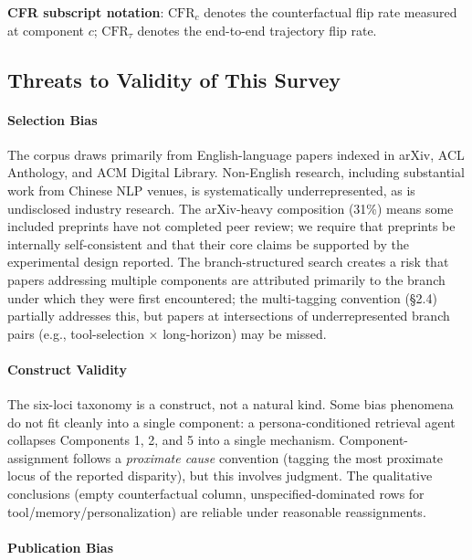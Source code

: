 \documentclass[acmsmall,nonacm]{acmart}
\begin{document}
\textbf{CFR subscript notation}: $\text{CFR}_c$ denotes the counterfactual flip rate measured at component $c$; $\text{CFR}_\tau$ denotes the end-to-end trajectory flip rate.


\subsection{Threats to Validity of This Survey}

\paragraph{Selection Bias}

The corpus draws primarily from English-language papers indexed in arXiv, ACL Anthology, and ACM Digital Library. Non-English research, including substantial work from Chinese NLP venues, is systematically underrepresented, as is undisclosed industry research. The arXiv-heavy composition (31\%) means some included preprints have not completed peer review; we require that preprints be internally self-consistent and that their core claims be supported by the experimental design reported. The branch-structured search creates a risk that papers addressing multiple components are attributed primarily to the branch under which they were first encountered; the multi-tagging convention (\S{}2.4) partially addresses this, but papers at intersections of underrepresented branch pairs (e.g., tool-selection $\times$ long-horizon) may be missed.

\paragraph{Construct Validity}

The six-loci taxonomy is a construct, not a natural kind. Some bias phenomena do not fit cleanly into a single component: a persona-conditioned retrieval agent collapses Components 1, 2, and 5 into a single mechanism. Component-assignment follows a \emph{proximate cause} convention (tagging the most proximate locus of the reported disparity), but this involves judgment. The qualitative conclusions (empty counterfactual column, unspecified-dominated rows for tool/memory/personalization) are reliable under reasonable reassignments.

\paragraph{Publication Bias}
\end{document}
